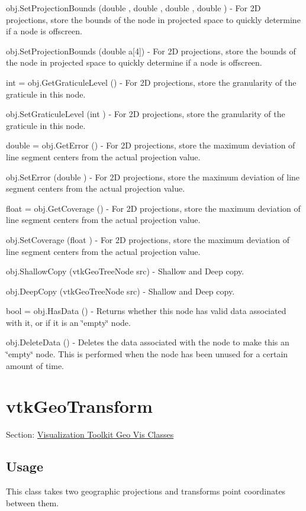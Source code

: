 \begin{DoxyItemize}
\item {\ttfamily obj.\-Set\-Projection\-Bounds (double , double , double , double )} -\/ For 2\-D projections, store the bounds of the node in projected space to quickly determine if a node is offscreen.  
\item {\ttfamily obj.\-Set\-Projection\-Bounds (double a\mbox{[}4\mbox{]})} -\/ For 2\-D projections, store the bounds of the node in projected space to quickly determine if a node is offscreen.  
\item {\ttfamily int = obj.\-Get\-Graticule\-Level ()} -\/ For 2\-D projections, store the granularity of the graticule in this node.  
\item {\ttfamily obj.\-Set\-Graticule\-Level (int )} -\/ For 2\-D projections, store the granularity of the graticule in this node.  
\item {\ttfamily double = obj.\-Get\-Error ()} -\/ For 2\-D projections, store the maximum deviation of line segment centers from the actual projection value.  
\item {\ttfamily obj.\-Set\-Error (double )} -\/ For 2\-D projections, store the maximum deviation of line segment centers from the actual projection value.  
\item {\ttfamily float = obj.\-Get\-Coverage ()} -\/ For 2\-D projections, store the maximum deviation of line segment centers from the actual projection value.  
\item {\ttfamily obj.\-Set\-Coverage (float )} -\/ For 2\-D projections, store the maximum deviation of line segment centers from the actual projection value.  
\item {\ttfamily obj.\-Shallow\-Copy (vtk\-Geo\-Tree\-Node src)} -\/ Shallow and Deep copy.  
\item {\ttfamily obj.\-Deep\-Copy (vtk\-Geo\-Tree\-Node src)} -\/ Shallow and Deep copy.  
\item {\ttfamily bool = obj.\-Has\-Data ()} -\/ Returns whether this node has valid data associated with it, or if it is an \char`\"{}empty\char`\"{} node.  
\item {\ttfamily obj.\-Delete\-Data ()} -\/ Deletes the data associated with the node to make this an \char`\"{}empty\char`\"{} node. This is performed when the node has been unused for a certain amount of time.  
\end{DoxyItemize}\hypertarget{vtkgeovis_vtkgeotransform}{}\section{vtk\-Geo\-Transform}\label{vtkgeovis_vtkgeotransform}
Section\-: \hyperlink{sec_vtkgeovis}{Visualization Toolkit Geo Vis Classes} \hypertarget{vtkwidgets_vtkxyplotwidget_Usage}{}\subsection{Usage}\label{vtkwidgets_vtkxyplotwidget_Usage}
This class takes two geographic projections and transforms point coordinates between them.

